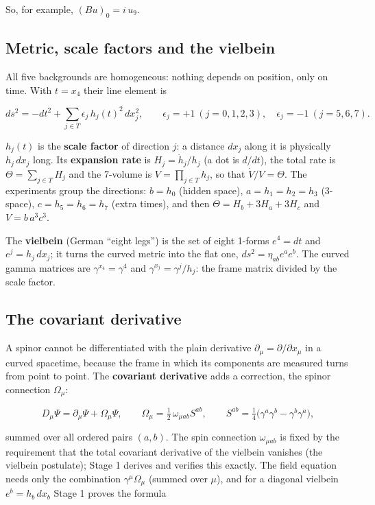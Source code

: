 \documentclass[11pt]{article}
\begin{document}
So, for example, $(Bu)_0=i\,u_9$.

\subsection{Metric, scale factors and the vielbein}

All five backgrounds are homogeneous: nothing depends on position, only on time. With $t=x_4$ their line element is

\[
ds^2=-dt^2+\sum_{j\in T}\epsilon_j\,h_j(t)^2\,dx_j^2,\qquad \epsilon_j=+1\ (j=0,1,2,3),\quad \epsilon_j=-1\ (j=5,6,7).
\]

$h_j(t)$ is the \textbf{scale factor} of direction $j$: a distance $dx_j$ along it is physically $h_j\,dx_j$ long. Its \textbf{expansion rate} is $H_j=\dot h_j/h_j$ (a dot is $d/dt$), the total rate is $\Theta=\sum_{j\in T}H_j$ and the 7-volume is $V=\prod_{j\in T}h_j$, so that $\dot V/V=\Theta$. The experiments group the directions: $b=h_0$ (hidden space), $a=h_1=h_2=h_3$ (3-space), $c=h_5=h_6=h_7$ (extra times), and then $\Theta=H_b+3H_a+3H_c$ and $V=b\,a^3c^3$.

The \textbf{vielbein} (German ``eight legs'') is the set of eight 1-forms $e^4=dt$ and $e^j=h_j\,dx_j$; it turns the curved metric into the flat one, $ds^2=\eta_{ab}e^ae^b$. The curved gamma matrices are $\gamma^{x_4}=\gamma^4$ and $\gamma^{x_j}=\gamma^j/h_j$: the frame matrix divided by the scale factor.

\subsection{The covariant derivative}

A spinor cannot be differentiated with the plain derivative $\partial_\mu=\partial/\partial x_\mu$ in a curved spacetime, because the frame in which its components are measured turns from point to point. The \textbf{covariant derivative} adds a correction, the spinor connection $\Omega_\mu$:

\[
D_\mu\Psi=\partial_\mu\Psi+\Omega_\mu\Psi,\qquad \Omega_\mu=\tfrac12\,\omega_{\mu ab}S^{ab},\qquad S^{ab}=\tfrac14\bigl(\gamma^a\gamma^b-\gamma^b\gamma^a\bigr),
\]

summed over all ordered pairs $(a,b)$. The spin connection $\omega_{\mu ab}$ is fixed by the requirement that the total covariant derivative of the vielbein vanishes (the vielbein postulate); Stage 1 derives and verifies this exactly. The field equation needs only the combination $\gamma^\mu\Omega_\mu$ (summed over $\mu$), and for a diagonal vielbein $e^b=h_b\,dx_b$ Stage 1 proves the formula
\end{document}
